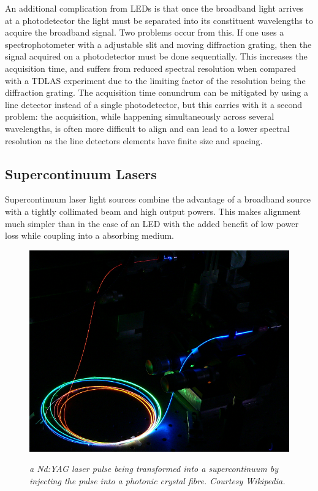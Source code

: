 An additional complication from \acp{LED} is that once the broadband light
arrives at a photodetector the light must be separated into its constituent
wavelengths to acquire the broadband signal. Two problems occur from
this. If one uses a spectrophotometer with a adjustable slit and moving
diffraction grating, then the signal acquired on a photodetector must be
done sequentially. This increases the acquisition time, and suffers from
reduced spectral resolution when compared with a \ac{TDLAS} experiment due
to the limiting factor of the resolution being the diffraction grating. The
acquisition time conundrum can be mitigated by using a line detector instead
of a single photodetector, but this carries with it a second problem: the
acquisition, while happening simultaneously across several wavelengths, is
often more difficult to align and can lead to a lower spectral resolution as
the line detectors elements have finite size and spacing.



\subsection{Supercontinuum Lasers}\label{subsec:super}

Supercontinuum laser light sources combine the advantage of a broadband source
with a tightly collimated beam and high output powers. This makes alignment
much simpler than in the case of an \ac{LED} with the added benefit of low
power loss while coupling into a absorbing medium.


\begin{figure}
\begin{center}
  \includegraphics[width=\marginspace]{figures/supercontinuum.png}
\end{center}
\emph{\footnotesize{a Nd:YAG laser pulse being transformed into a supercontinuum by injecting the pulse into a photonic crystal fibre. Courtesy Wikipedia.}}
\end{figure}

